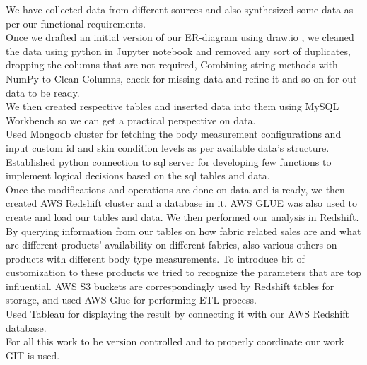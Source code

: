 \documentclass[11pt,journal,compsoc]{IEEEtran}
\begin{document}
We have collected data from different sources and also synthesized some data as per our functional requirements. \\
Once we drafted an initial version of our  ER-diagram using draw.io , we cleaned the data using python in Jupyter notebook and removed any sort of duplicates, dropping the columns that are not required, Combining string methods with NumPy to Clean Columns, check for missing data and refine it and so on for out data to be ready.   \\
We then created respective tables and inserted data into them using MySQL Workbench so we can get a practical perspective on data. \\
Used Mongodb cluster for fetching the body measurement configurations and input custom id and skin condition levels as per available data's structure. \\
Established python connection to sql server for developing few functions to implement logical decisions based on the sql tables and data. \\
Once the modifications and operations are done on data and is ready, we then created AWS Redshift cluster and a database in it. AWS GLUE was also used to create and load our tables and data. We then performed our analysis in Redshift. By querying information from our tables on how fabric related sales are and what are different products' availability on different fabrics, also various others on products with different body type measurements. To introduce bit of customization to these products we tried to recognize the parameters that are top influential. AWS S3 buckets are correspondingly used by Redshift tables for storage, and used AWS Glue for performing ETL process.  \\
Used Tableau for displaying the result by connecting it with our AWS Redshift database. \\
For all this work to be version controlled and to properly coordinate our work GIT is used. \\

\\
\end{document}
